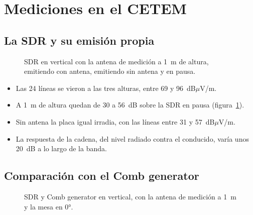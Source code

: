 \documentclass[11pt,a4paper]{article}
\begin{document}
\section{Mediciones en el CETEM}

\subsection{La SDR y su emisión propia}

\begin{figure}[H]
  \centering
  \caption{SDR en vertical con la antena de medición a 1~m de altura, emitiendo con antena, emitiendo sin antena y en pausa.}
  \label{fig:sdr}
\end{figure}

\begin{itemize}
  \item Las 24 líneas se vieron a las tres alturas, entre 69 y 96~dB$\mu$V/m.
  \item A 1~m de altura quedan de 30 a 56~dB sobre la SDR en pausa (figura~\ref{fig:sdr}).
  \item Sin antena la placa igual irradia, con las líneas entre 31 y 57~dB$\mu$V/m.
  \item La respuesta de la cadena, del nivel radiado contra el conducido, varía unos 20~dB a lo largo de la banda.
\end{itemize}

\subsection{Comparación con el Comb generator}

\begin{figure}[H]
  \centering
  \caption{SDR y Comb generator en vertical, con la antena de medición a 1~m y la mesa en 0°.}
  \label{fig:comb}
\end{figure}
\end{document}
